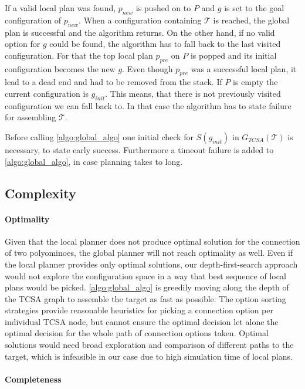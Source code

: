 If a valid local plan was found, $p_{new}$ is pushed on to $P$ and $g$ is set to the goal configuration of $p_{new}$.
When a configuration containing $\mathcal{T}$ is reached, the global plan is successful and the algorithm returns.
On the other hand, if no valid option for $g$ could be found, the algorithm has to fall back to the last visited configuration.
For that the top local plan $p_{pre}$ on $P$ is popped and its initial configuration becomes the new $g$.
Even though $p_{pre}$ was a successful local plan, it lead to a dead end and had to be removed from the stack.
If $P$ is empty the current configuration is $g_{init}$.
This means, that there is not previously visited configuration we can fall back to.
In that case the algorithm has to state failure for assembling $\mathcal{T}$.

Before calling \autoref{algo:global_algo} one initial check for $S(g_{init})$ in $G_{\textit{TCSA}}(\mathcal{T})$ is necessary, to state early success.
Furthermore a timeout failure is added to \autoref{algo:global_algo}, in case planning takes to long.
 
\subsection{Complexity}

\paragraph{Optimality}

Given that the local planner does not produce optimal solution for the connection of two polyominoes, the global planner will not reach optimality as well.
Even if the local planner provides only optimal solutions, our depth-first-search approach would not explore the configuration space in a way that best sequence of local plans would be picked.
\autoref{algo:global_algo} is greedily moving along the depth of the TCSA graph to assemble the target as fast as possible.
The option sorting strategies provide reasonable heuristics for picking a connection option per individual TCSA node, but cannot ensure the optimal decision let alone the optimal decision for the whole path of connection options taken.
Optimal solutions would need broad exploration and comparison of different paths to the target, which is infeasible in our case due to high simulation time of local plans.

\paragraph{Completeness}

